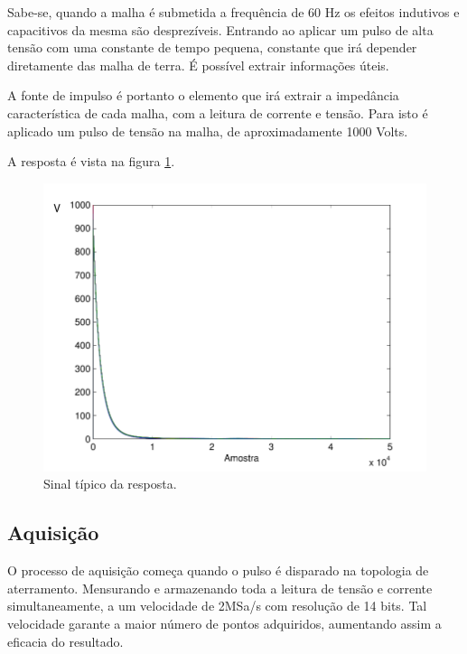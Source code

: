 \documentclass[a4paper, 10pt]{article}
\begin{document}
Sabe-se, quando a malha é submetida a frequência de 60 Hz os efeitos indutivos e 
capacitivos da mesma são desprezíveis. Entrando ao aplicar um pulso de 
alta tensão com uma constante de tempo pequena, constante que irá 
depender diretamente das malha de terra. É possível extrair informações
úteis. 

A fonte de impulso é portanto o elemento que irá extrair a impedância
característica de cada malha, com a leitura de corrente e tensão. 
Para isto é aplicado um pulso de tensão na malha, de aproximadamente
1000 Volts. 

A resposta é vista na figura \ref{fig_sinal}. 

\begin{figure}[!h]
    \caption{\label{fig_sinal} Sinal típico da resposta.}
	    \begin{center}
            \includegraphics[scale=0.5]{../fotos/sinal/sinal-eps-converted-to.pdf}
	    \end{center}
\end{figure}

\subsection{Aquisição}

O processo de aquisição começa quando o pulso é disparado na topologia de aterramento.
Mensurando e armazenando toda a leitura de tensão e corrente simultaneamente, a um velocidade
de 2MSa/s com resolução de 14 bits. 
Tal velocidade garante a maior número de pontos adquiridos, 
aumentando assim a eficacia do resultado.
\end{document}
